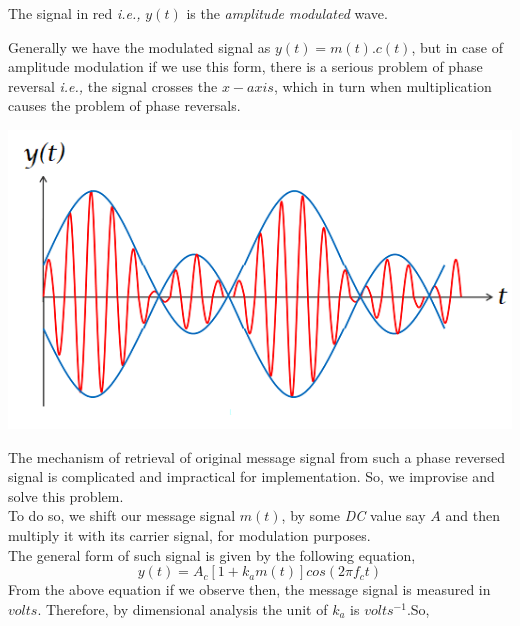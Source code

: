 \documentclass[12pt,a4paper]{article}%
\begin{document}
\begin{flushleft}
\begin{flushleft}
\begin{center}
			\end{center}
			\begin{center}
				The signal in red \textit{i.e.,} $y(t)$ is the \textit{amplitude modulated} wave.
			\end{center}
		Generally we have the modulated signal as $y(t)=m(t).c(t)$, but in case of amplitude modulation if we use this form, there is a serious problem of phase reversal \textit{i.e.,} the signal crosses the $x-axis$, which in turn when multiplication causes the problem of phase reversals.
		\end{flushleft}
		\begin{center}
			\includegraphics[width=0.60 \textwidth]{./images/SDC-Phase Reversal_1.png}
		\end{center}
		The mechanism of retrieval of original message signal from such a phase reversed signal is complicated and impractical for implementation. So, we improvise and solve this problem.\\\smallskip
		To do so, we shift our message signal $m(t)$, by some \textit{DC} value say $A$ and then multiply it with its carrier signal, for modulation purposes.\\\smallskip
		The general form of such signal is given by the following equation,
		\begin{equation}
			y(t)=A_c [1+k_a m(t)]cos(2 \pi f_c t)
		\end{equation}
		From the above equation if we observe then, the message signal is measured in $volts$. Therefore, by dimensional analysis the unit of $k_a$ is $volts^{-1}$.So,\\\smallskip

\end{flushleft}
\end{document}
